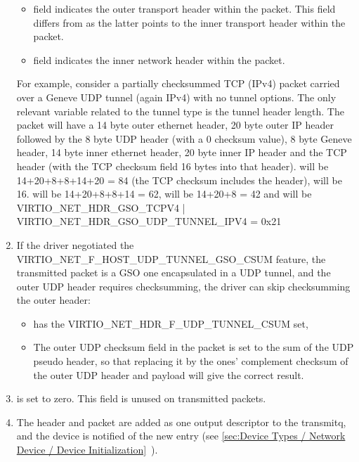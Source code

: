 \begin{enumerate}
  \begin{itemize}
  \item {} field indicates the outer transport header within
      the packet. This field differs from  as the latter
      points to the inner transport header within the packet.

  \item {} field indicates the inner network header within
      the packet.
  \end{itemize}

\begin{note}
For example, consider a partially checksummed TCP (IPv4) packet carried over a
Geneve UDP tunnel (again IPv4) with no tunnel options. The
only relevant variable related to the tunnel type is the tunnel header length.
The packet will have a 14 byte outer ethernet header, 20 byte outer IP header
followed by the 8 byte UDP header (with a 0 checksum value), 8 byte Geneve header,
14 byte inner ethernet header, 20 byte inner IP header
and the TCP header (with the TCP checksum field 16 bytes
into that header).  will be 14+20+8+8+14+20 = 84 (the TCP
checksum includes the header),  will be 16.
 will be 14+20+8+8+14 = 62,  will be
14+20+8 = 42 and  will be
VIRTIO_NET_HDR_GSO_TCPV4 | VIRTIO_NET_HDR_GSO_UDP_TUNNEL_IPV4 = 0x21
\end{note}

\item If the driver negotiated the VIRTIO_NET_F_HOST_UDP_TUNNEL_GSO_CSUM feature,
  the transmitted packet is a GSO one encapsulated in a UDP tunnel, and
  the outer UDP header requires checksumming, the driver can skip checksumming
  the outer header:

  \begin{itemize}
  \item {} has the VIRTIO_NET_HDR_F_UDP_TUNNEL_CSUM set,

  \item The outer UDP checksum field in the packet is set to the sum
    of the UDP pseudo header, so that replacing it by the ones'
    complement checksum of the outer UDP header and payload will give the
    correct result.
  \end{itemize}

\item {} is set to zero.  This field is unused on transmitted packets.

\item The header and packet are added as one output descriptor to the
  transmitq, and the device is notified of the new entry
  (see \ref{sec:Device Types / Network Device / Device Initialization}~).
\end{enumerate}

